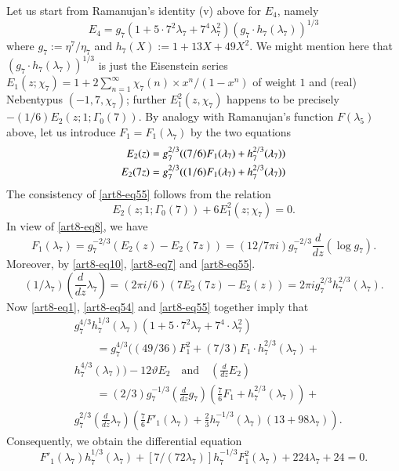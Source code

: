 Let us start from Ramanujan's identity (v) above for $E_{4}$, namely
\begin{equation}
E_{4}=g_{7}(1+5\cdot 7^{2}\lambda_{7}+7^{4}\lambda^{2}_{7})(g_{7}\cdot h_{7}(\lambda_{7}))^{1/3}\label{art8-eq54}
\end{equation}
where $g_{7}:=\eta^{7}/\eta_{7}$ and $h_{7}(X):=1+13X+49X^{2}$. We might mention here that $(g_{7}\cdot h_{7}(\lambda_{7}))^{1/3}$ is just the Eisenstein series $E_{1}(z;\chi_{7})=1+2\sum\limits^{\infty}_{n=1}\chi_{7}(n)\times x^{n}/(1-x^{n})$ of weight $1$ and (real) Nebentypus $(-1,7,\chi_{7})$; further $E^{2}_{1}(z,\chi_{7})$ happens to be precisely $-(1/6)E_{2}(z;1;\Gamma_{0}(7))$. By analogy with Ramanujan's function $F(\lambda_{5})$ above, let us introduce $F_{1}=F_{1}(\lambda_{7})$ by the two equations
\begin{align}
E_{2}(z) &= g^{2/3}_{7}((7/6)F_{1}(\lambda_{7})+h^{2/3}_{7}(\lambda_{7}))\notag\\
E_{2}(7z) &= g^{2/3}_{7}((1/6)F_{1}(\lambda_{7})+h^{2/3}_{7}(\lambda_{7}))\label{art8-eq55}
\end{align}
The consistency of \eqref{art8-eq55} follows from the relation 
$$
E_{2}(z;1;\Gamma_{0}(7))+6E^{2}_{1}(z;\chi_{7})=0.
$$ 
In view of \eqref{art8-eq8}, we have 
$$
F_{1}(\lambda_{7})=g^{-2/3}_{7}(E_{2}(z)-E_{2}(7z))=(12/7\pi i)g^{-2/3}_{7}\frac{d}{dz}(\log g_{7}).
$$ 
Moreover, by \eqref{art8-eq10}, \eqref{art8-eq7} and \eqref{art8-eq55}.
$$
(1/\lambda_{7})\left(\frac{d}{dz}{\lambda_{7}}\right)=(2\pi i/6)(7E_{2}(7z)-E_{2}(z))=2\pi ig^{2/3}_{7}h^{2/3}_{7}(\lambda_{7}).
$$
Now \eqref{art8-eq1}, \eqref{art8-eq54} and \eqref{art8-eq55} together imply that
\begin{align*}
& g^{4/3}_{7}h^{1/3}_{7}(\lambda_{7})(1+5\cdot 7^{2}\lambda_{7}+7^{4}\cdot \lambda^{2}_{7})\\
&\qquad =g^{4/3}_{7}((49/36)F^{2}_{1}+(7/3)F_{1}\cdot h^{2/3}_{7}(\lambda_{7})+\\
& h^{4/3}_{7}(\lambda_{7}))-12\vartheta E_{2}\text{~~ and~~ } \left(\frac{d}{dz}E_{2}\right)\\
&\qquad =(2/3)g^{-1/3}_{7}\left(\frac{d}{dz}g_{7}\right)\left(\frac{7}{6}F_{1}+h^{2/3}_{7}(\lambda_{7})\right)+\\
& g^{2/3}_{7}\left(\frac{d}{dz}\lambda_{7}\right)\left(\frac{7}{6}F'_{1}(\lambda_{7})+\frac{2}{3}h^{-1/3}_{7}(\lambda_{7})(13+98\lambda_{7})\right).
\end{align*}
Consequently, we obtain the differential equation
$$
F'_{1}(\lambda_{7})h^{1/3}_{7}(\lambda_{7})+[7/(72\lambda_{7})]h^{-1/3}_{7}F^{2}_{1}(\lambda_{7})+224\lambda_{7}+24=0.
$$
